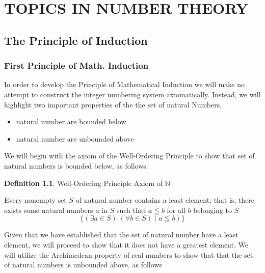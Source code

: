 \documentclass{book}
\theoremstyle{definition}
\newtheorem{definition}{Definition}[section]
\theoremstyle{remark}
\newcommand{\bb}[1]{\mathbb{#1}}
\begin{document}
\newpage
\chapter{TOPICS IN NUMBER THEORY}

\section{The Principle of Induction}
\subsection{First Principle of Math. Induction}

In order to develop the Principle of Mathematical Induction we will make no attempt to construct the integer numbering system axiomatically. Instead, we will highlight two important properties of the the set of natural Numbers,
    \begin{itemize}
        \item natural number are bounded below
        \item natural number are unbounded above
    \end{itemize}
We will begin with the axiom of the Well-Ordering Principle to show that set of natural numbers is bounded below, as follows:    

\begin{definition}
Well-Ordering Principle Axiom of $\bb{N}$ \\

\begin{tcolorbox}
    Every nonempty set $S$ of natural number contains a least element; that is, there exists some natural numbers $a$ in $S$ such that $a \leqq b$ for all $b$ belonging to $S$
        \begin{equation*}
            \{ (\exists a \in S) | (\forall b \in S)(a \leqq b) \}
        \end{equation*}
\end{tcolorbox}
\end{definition}


Given that we have established that the set of natural number have a least element, we will proceed to show that it does not have a greatest element. We will utilize the Archimedean property of real numbers to show that that the set of natural numbers is unbounded above, as follows
\end{document}
